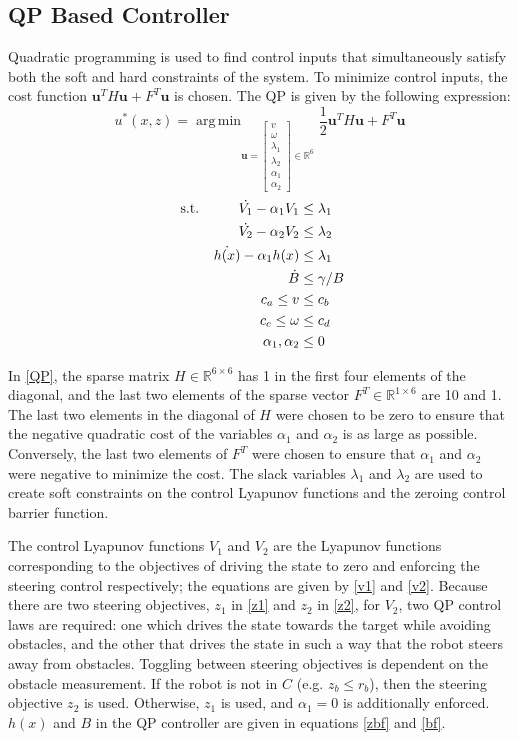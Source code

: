 \documentclass[conference]{IEEEtran}
\DeclareMathOperator*{\argmin}{arg\,min}
\begin{document}
\subsection{QP Based Controller}
Quadratic programming is used to find control inputs that simultaneously satisfy both the soft and hard constraints of the system. To minimize control inputs, the cost function $\textbf{u}^TH\textbf{u}+F^T\textbf{u}$ is chosen. The QP is given by the following expression:
\begin{equation}
u^*(x,z) = \argmin_{\textbf{u}=
\left[\begin{matrix}
v\\
\omega\\
\lambda_1\\
\lambda_2\\
\alpha_1\\
\alpha_2
\end{matrix}\right]
\in \mathbb{R}^6}
\frac{1}{2}\textbf{u}^TH\textbf{u}+F^T\textbf{u} 
\label{QP}
\end{equation}
\begin{align}
\text{ s.t.\hspace{1cm}}
\dot{V_1} -\alpha_1 V_1 & \leq\lambda_1\\
\dot{V_2} -\alpha_2 V_2 & \leq\lambda_2\\
\dot{h(x)}-\alpha_1 h(x) & \leq \lambda_1\\
\dot{B} & \leq \gamma/B\\
c_a \leq v & \leq c_b\\
c_c\leq \omega & \leq c_d\\
\alpha_1,\alpha_2 & \leq 0
\end{align}

In \eqref{QP}, the sparse matrix $H\in \mathbb{R}^{6\times 6}$ has 1 in the first four elements of the diagonal, and the last two elements of the sparse vector $F^T\in \mathbb{R}^{1\times 6}$ are 10 and 1. The last two elements in the diagonal of $H$ were chosen to be zero to ensure that the negative quadratic cost of the variables $\alpha_1$ and $\alpha_2$ is as large as possible. Conversely, the last two elements of $F^T$ were chosen to ensure that $\alpha_1$ and $\alpha_2$ were negative to minimize the cost. The slack variables $\lambda_1$ and $\lambda_2$ are used to create soft constraints on the control Lyapunov functions and the zeroing control barrier function.

The control Lyapunov functions $V_1$ and $V_2$ are the Lyapunov functions corresponding to the objectives of driving the state to zero and enforcing the steering control respectively; the equations are given by \eqref{v1} and \eqref{v2}. Because there are two steering objectives, $z_1$ in \eqref{z1} and $z_2$ in \eqref{z2}, for $V_2$, two QP control laws are required: one which drives the state towards the target while avoiding obstacles, and the other that drives the state in such a way that the robot steers away from obstacles. Toggling between steering objectives is dependent on the obstacle measurement. If the robot is not in $C$ (e.g. $z_b\leq r_b$), then the steering objective $z_2$ is used. Otherwise, $z_1$ is used, and $\alpha_1=0$ is additionally enforced. $h(x)$ and $B$ in the QP controller are given in equations \eqref{zbf} and \eqref{bf}. 
\end{document}
